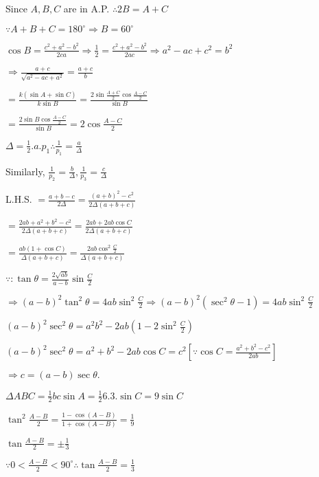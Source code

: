 \item Since $A, B, C$ are in A.P. $\therefore 2B = A + C$

  $\because A + B + C = 180^\circ \Rightarrow B = 60^\circ$

  $\cos B = \frac{c^2 + a^2 - b^2}{2ca} \Rightarrow \frac{1}{2} = \frac{c^2 + a^2 - b^2}{2ac} \Rightarrow a^2 - ac + c^2 =
  b^2$

  $\Rightarrow \frac{a + c}{\sqrt{a^2 - ac + a^2}} = \frac{a + c}{b}$

  $= \frac{k(\sin A + \sin C)}{k\sin B} = \frac{2\sin\frac{A + C}{2}\cos\frac{A - C}{2}}{\sin B}$

  $= \frac{2\sin B\cos \frac{A - C}{2}}{\sin B} = 2\cos\frac{A - C}{2}$

\item $\Delta = \frac{1}{2}.a.p_1 \therefore \frac{1}{p_1} = \frac{a}{\Delta}$

  Similarly, $\frac{1}{p_2} = \frac{b}{\Delta}, \frac{1}{p_3} = \frac{c}{\Delta}$

  L.H.S. $= \frac{a + b - c}{2\Delta} = \frac{(a + b)^2 - c^2}{2\Delta(a + b + c)}$

  $= \frac{2ab + a^2 + b^2 - c^2}{2\Delta(a + b + c)} = \frac{2ab + 2ab\cos C}{2\Delta(a + b + c)}$

  $= \frac{ab(1 + \cos C)}{\Delta(a + b + c)} = \frac{2ab\cos^2\frac{C}{2}}{\Delta(a + b + c)}$

\item $\because :\tan\theta = \frac{2\sqrt{ab}}{a - b}\sin\frac{C}{2}$

  $\Rightarrow (a - b)^2\tan^2\theta = 4ab\sin^2\frac{C}{2} \Rightarrow (a - b)^2(\sec^2\theta - 1) = 4ab\sin^2\frac{C}{2}$

  $(a - b)^2\sec^2\theta = a^2b^2 -2ab\left(1 - 2\sin^2\frac{C}{2}\right)$

  $(a - b)^2\sec^2\theta = a^2 + b^2 - 2ab\cos C = c^2[\because \cos C = \frac{a^2 + b^2 - c^2}{2ab}]$

  $\Rightarrow c = (a - b)\sec\theta.$

\item $\Delta ABC = \frac{1}{2}bc\sin A = \frac{1}{2}6.3.\sin C = 9\sin C$

  $\tan^2\frac{A - B}{2} = \frac{1 - \cos(A - B)}{1 + \cos(A - B)} = \frac{1}{9}$

  $\tan\frac{A - B}{2} = \pm\frac{1}{3}$

  $\because 0 < \frac{A - B}{2} < 90^\circ \therefore \tan\frac{A - B}{2} = \frac{1}{3}$

